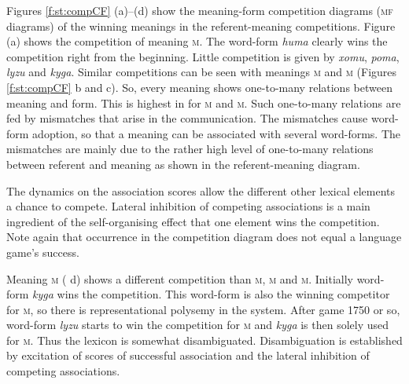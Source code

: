 Figures \ref{f:st:compCF} (a)--(d) show the meaning-form competition diagrams ({\scshape mf} diagrams) of the winning meanings in the referent-meaning competitions. Figure (a) shows the competition of meaning {\scshape m}. The word-form {\it huma} clearly wins the competition right from the beginning. Little competition is given by {\it xomu}, {\it poma}, {\it lyzu} and {\it kyga}. Similar competitions can be seen with meanings {\scshape m} and {\scshape m} (Figures \ref{f:st:compCF} b and c). So, every meaning shows one-to-many relations between meaning and form. This is highest in for {\scshape m} and {\scshape m}. Such one-to-many relations are fed by mismatches that arise in the communication. The mismatches cause word-form adoption, so that a meaning can be associated with several word-forms. The mismatches are mainly due to the rather high level of one-to-many relations between referent and meaning as shown in the referent-meaning diagram. 

The dynamics on the association scores allow the different other lexical elements a chance to compete. Lateral inhibition of competing associations is a main ingredient of the self-organising effect that one element wins the competition. Note again that occurrence in the competition diagram does not equal a language game's success.

Meaning {\scshape m} ( d) shows a different competition than {\scshape m}, {\scshape m} and {\scshape m}. Initially word-form {\it kyga} wins the competition. This word-form is also the winning competitor for {\scshape m}, so there is representational polysemy in the system. After game 1750 or so, word-form {\it lyzu} starts to win the competition for {\scshape m} and {\it kyga} is then solely used for {\scshape m}. Thus the lexicon is somewhat disambiguated. Disambiguation is established by excitation of scores of successful association and the lateral inhibition of competing associations.

